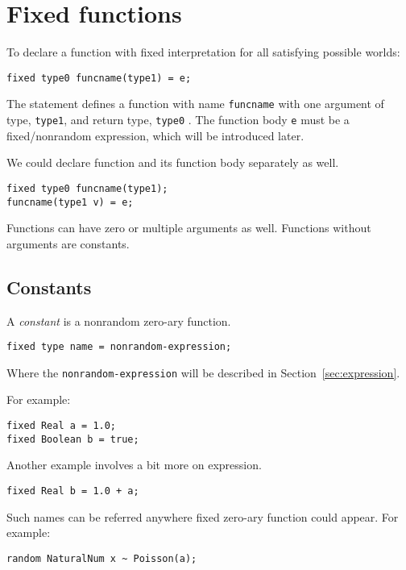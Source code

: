 \documentclass[12pt]{article}
\begin{document}
\section{Fixed functions}
To declare a function with fixed interpretation for all satisfying possible worlds:
\begin{verbatim}
fixed type0 funcname(type1) = e;
\end{verbatim}
The statement defines a function with name \texttt{funcname} with one argument of type, \texttt{type1}, and return type, \texttt{type0} . The function body \texttt{e} must be a fixed/nonrandom expression, which will be introduced later. 

We could declare function and its function body separately as well. 
\begin{verbatim}
fixed type0 funcname(type1);
funcname(type1 v) = e;
\end{verbatim}


Functions can have zero or multiple arguments as well. Functions without arguments are constants. 

\subsection{Constants}
A {\em constant} is a nonrandom zero-ary function.
\begin{verbatim}
fixed type name = nonrandom-expression;
\end{verbatim} 
Where the {\tt nonrandom-expression} will be described in Section~\ref{sec:expression}.

For example:
\begin{verbatim}
fixed Real a = 1.0;
fixed Boolean b = true;
\end{verbatim}

Another example involves a bit more on expression.
\begin{verbatim}
fixed Real b = 1.0 + a;
\end{verbatim}

Such names can be referred anywhere fixed zero-ary function could appear.
For example:
\begin{verbatim}
random NaturalNum x ~ Poisson(a);
\end{verbatim}
\end{document}

